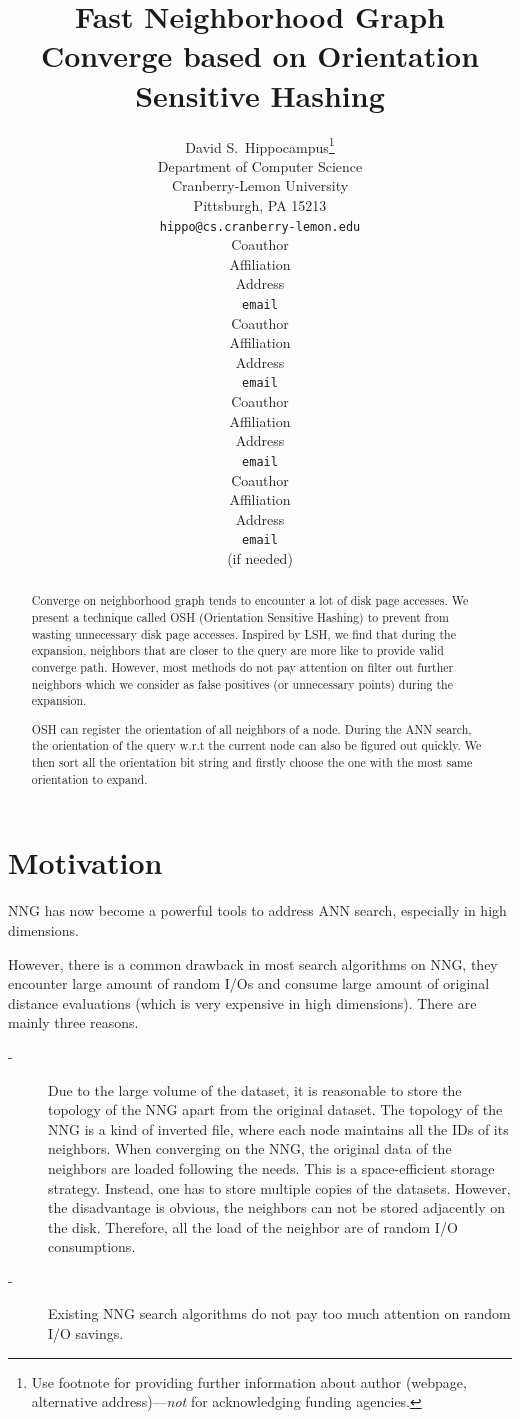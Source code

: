\documentclass{article} %
\title{Fast Neighborhood Graph Converge based on Orientation Sensitive Hashing}
\author{
David S.~Hippocampus\thanks{ Use footnote for providing further information
about author (webpage, alternative address)---\emph{not} for acknowledging
funding agencies.} \\
Department of Computer Science\\
Cranberry-Lemon University\\
Pittsburgh, PA 15213 \\
\texttt{hippo@cs.cranberry-lemon.edu} \\
\And
Coauthor \\
Affiliation \\
Address \\
\texttt{email} \\
\AND
Coauthor \\
Affiliation \\
Address \\
\texttt{email} \\
\And
Coauthor \\
Affiliation \\
Address \\
\texttt{email} \\
\And
Coauthor \\
Affiliation \\
Address \\
\texttt{email} \\
(if needed)\\
}
\begin{document}
\maketitle

\begin{abstract}
Converge on neighborhood graph tends to encounter a lot of disk page accesses. We present a technique called OSH (Orientation Sensitive Hashing) to prevent from wasting unnecessary disk page accesses. Inspired by LSH, we find that during the expansion, neighbors that are closer to the query are more like to provide valid converge path. However, most methods do not pay attention on filter out further neighbors which we consider as false positives (or unnecessary points) during the expansion.

OSH can register the orientation of all neighbors of a node. During the ANN search, the orientation of the query w.r.t the current node can also be figured out quickly. We then sort all the orientation bit string and firstly choose the one with the most same orientation to expand. 
\end{abstract}



\section{Motivation}\label{ssec:moti}
NNG has now become a powerful tools to address ANN search, especially in high dimensions.


However, there is a common drawback in most search algorithms on NNG, they encounter large amount of random I/Os and consume large amount of original distance evaluations (which is very expensive in high dimensions). 
There are mainly three reasons.
\begin{description}
	\item [-] Due to the large volume of the dataset, it is reasonable to store the topology of the NNG apart from the original dataset. The topology of the NNG is a kind of inverted file, where each node maintains all the IDs of its neighbors. When converging on the NNG, the original data of the neighbors are loaded following the needs. This is a space-efficient storage strategy. Instead, one has to store multiple copies of the datasets. However, the disadvantage is obvious, the neighbors can not be stored adjacently on the disk. Therefore, all the load of the neighbor are of random I/O consumptions.
	\item [-] Existing NNG search algorithms do not pay too much attention on random I/O savings.
\end{description}
\end{document}
